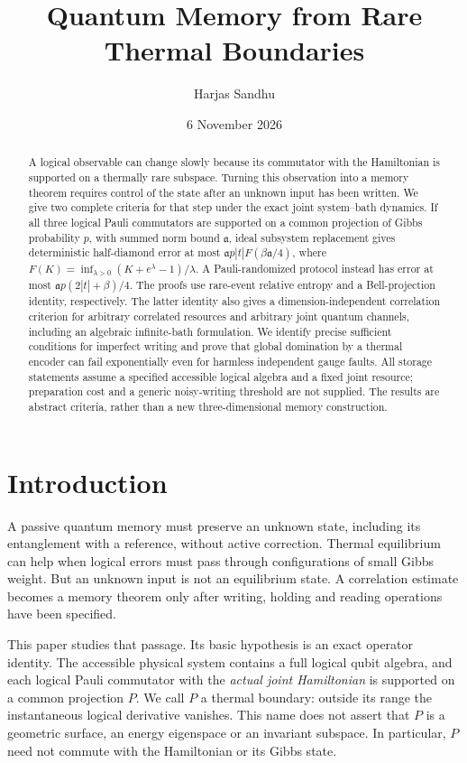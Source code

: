 \documentclass[11pt,reqno]{amsart}
\title[Quantum memory from rare thermal boundaries]{Quantum Memory from Rare Thermal Boundaries}
\author{Harjas Sandhu}
\date{6 November 2026}
\numberwithin{equation}{section}
\theoremstyle{definition}
\theoremstyle{remark}
\newcommand{\pa}{\mathfrak a}
\begin{document}
\begin{abstract}
A logical observable can change slowly because its commutator with the
Hamiltonian is supported on a thermally rare subspace. Turning this observation
into a memory theorem requires control of the state after an unknown input has
been written. We give two complete criteria for that step under the exact joint
system--bath dynamics. If all three logical Pauli commutators are supported on
a common projection of Gibbs probability \(p\), with summed norm bound
\(\pa\), ideal subsystem replacement gives deterministic half-diamond error
at most \(\pa p|t|F(\beta\pa/4)\), where
\(F(K)=\inf_{\lambda>0}(K+e^\lambda-1)/\lambda\).
A Pauli-randomized protocol instead has error at most
\(\pa p(2|t|+\beta)/4\).
The proofs use rare-event relative entropy and a Bell-projection identity,
respectively. The latter identity also gives a dimension-independent
correlation criterion for arbitrary correlated resources and arbitrary joint
quantum channels, including an algebraic infinite-bath formulation.
We identify precise sufficient conditions for imperfect writing and prove that
global domination by a thermal encoder can fail exponentially even for harmless
independent gauge faults. All storage statements assume a specified accessible
logical algebra and a fixed joint resource; preparation cost and a generic
noisy-writing threshold are not supplied. The results are abstract criteria,
rather than a new three-dimensional memory construction.
\end{abstract}
\maketitle
\setcounter{tocdepth}{1}
\tableofcontents
\clearpage
\section{Introduction}\label{sec:introduction}

A passive quantum memory must preserve an unknown state, including its
entanglement with a reference, without active correction. Thermal equilibrium
can help when logical errors must pass through configurations of small Gibbs
weight. But an unknown input is not an equilibrium state. A correlation
estimate becomes a memory theorem only after writing, holding and reading
operations have been specified.

This paper studies that passage. Its basic hypothesis is an exact operator
identity. The accessible physical system contains a full logical qubit algebra,
and each logical Pauli commutator with the \emph{actual joint Hamiltonian}
is supported on a common projection \(P\). We call \(P\) a thermal boundary:
outside its range the instantaneous logical derivative vanishes. This name
does not assert that \(P\) is a geometric surface, an energy eigenspace or an
invariant subspace. In particular, \(P\) need not commute with the Hamiltonian
or its Gibbs state.
\end{document}
